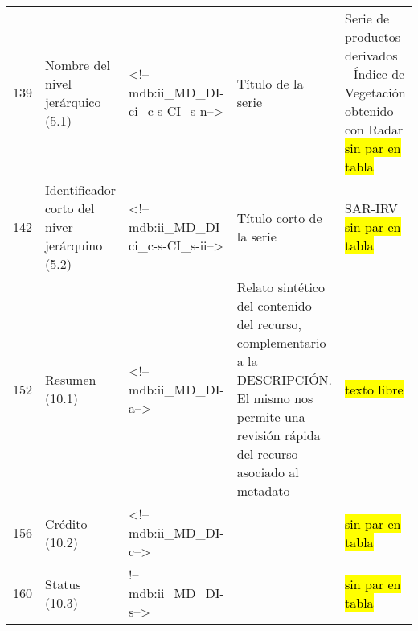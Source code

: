 \documentclass{GVT_CONAE_Class}
\begin{document}
\begin{landscape}
\begin{longtable}[c]{| p{1.5cm} | p{4cm} | p{6cm} | p{4cm}| p{6cm} |}
139 & Nombre del nivel jerárquico (5.1) & <!--mdb:ii\_MD\_DI-ci\_c-s-CI\_s-n--> & Título de la serie & Serie de productos derivados - Índice de Vegetación obtenido con Radar \hl{sin par en tabla}\\
142 & Identificador corto del niver jerárquino (5.2) & <!--mdb:ii\_MD\_DI-ci\_c-s-CI\_s-ii--> & Título corto de la serie & SAR-IRV \hl{sin par en tabla}\\

152 & Resumen (10.1) & <!--mdb:ii\_MD\_DI-a--> & Relato sintético del contenido del recurso, complementario a la DESCRIPCIÓN. El mismo nos permite una revisión rápida del recurso asociado al metadato & \hl{texto libre}\\

156 & Crédito (10.2) & <!--mdb:ii\_MD\_DI-c--> & & \hl{sin par en tabla} \\
160 & Status (10.3) & !--mdb:ii\_MD\_DI-s--> & & \hl{sin par en tabla} \\



\end{longtable}
\end{landscape}
\end{document}
